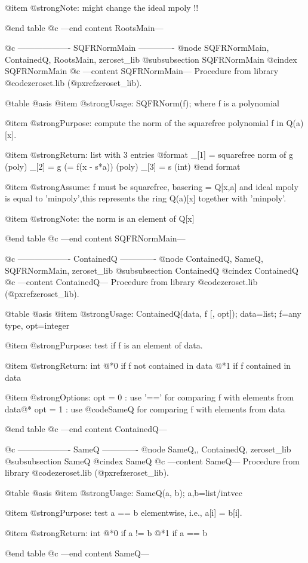 @item @strong{Note:}
might change the ideal mpoly !!

@end table
@c ---end content RootsMain---

@c ------------------- SQFRNormMain -------------
@node SQFRNormMain, ContainedQ, RootsMain, zeroset_lib
@subsubsection SQFRNormMain
@cindex SQFRNormMain
@c ---content SQFRNormMain---
Procedure from library @code{zeroset.lib} (@pxref{zeroset_lib}).

@table @asis
@item @strong{Usage:}
SQFRNorm(f); where f is a polynomial

@item @strong{Purpose:}
compute the norm of the squarefree polynomial f in Q(a)[x].

@item @strong{Return:}
list with 3 entries
  @format
  _[1] = squarefree norm of g (poly)
  _[2] = g (= f(x - s*a)) (poly)
  _[3] = s (int)
  @end format

@item @strong{Assume:}
f must be squarefree, basering = Q[x,a] and ideal mpoly is equal to
'minpoly',this represents the ring Q(a)[x] together with 'minpoly'.

@item @strong{Note:}
the norm is an element of Q[x]

@end table
@c ---end content SQFRNormMain---

@c ------------------- ContainedQ -------------
@node ContainedQ, SameQ, SQFRNormMain, zeroset_lib
@subsubsection ContainedQ
@cindex ContainedQ
@c ---content ContainedQ---
Procedure from library @code{zeroset.lib} (@pxref{zeroset_lib}).

@table @asis
@item @strong{Usage:}
ContainedQ(data, f [, opt]); data=list; f=any type, opt=integer

@item @strong{Purpose:}
test if f is an element of data.

@item @strong{Return:}
int
@*0 if f not contained in data
@*1 if f contained in data

@item @strong{Options:}
opt = 0 : use '==' for comparing f with elements from data@*
opt = 1 : use @code{SameQ} for comparing f with elements from data

@end table
@c ---end content ContainedQ---

@c ------------------- SameQ -------------
@node SameQ,, ContainedQ, zeroset_lib
@subsubsection SameQ
@cindex SameQ
@c ---content SameQ---
Procedure from library @code{zeroset.lib} (@pxref{zeroset_lib}).

@table @asis
@item @strong{Usage:}
SameQ(a, b); a,b=list/intvec

@item @strong{Purpose:}
test a == b elementwise, i.e., a[i] = b[i].

@item @strong{Return:}
int
@*0 if a != b
@*1 if a == b

@end table
@c ---end content SameQ---
